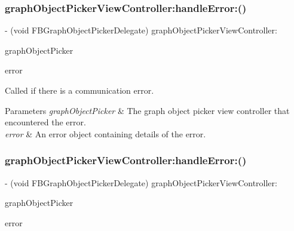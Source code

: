 \subsubsection{\texorpdfstring{graph\+Object\+Picker\+View\+Controller\+:handle\+Error\+:()}{graphObjectPickerViewController:handleError:()}\hspace{0.1cm}{\footnotesize\ttfamily [1/5]}}
{\footnotesize\ttfamily -\/ (void F\+B\+Graph\+Object\+Picker\+Delegate) graph\+Object\+Picker\+View\+Controller\+: \begin{DoxyParamCaption}\item[{(\hyperlink{interfaceFBGraphObjectPickerViewController}{F\+B\+Graph\+Object\+Picker\+View\+Controller} $\ast$)}]{graph\+Object\+Picker }\item[{handleError:(N\+S\+Error $\ast$)}]{error }\end{DoxyParamCaption}\hspace{0.3cm}{\ttfamily [optional]}}

Called if there is a communication error.


\begin{DoxyParams}{Parameters}
{\em graph\+Object\+Picker} & The graph object picker view controller that encountered the error. \\
\hline
{\em error} & An error object containing details of the error. \\
\hline
\end{DoxyParams}
\mbox{\label{protocolFBGraphObjectPickerDelegate_01-p_a99107978ecbc60a1a7daeeb2367d5cbf}} 
\subsubsection{\texorpdfstring{graph\+Object\+Picker\+View\+Controller\+:handle\+Error\+:()}{graphObjectPickerViewController:handleError:()}\hspace{0.1cm}{\footnotesize\ttfamily [2/5]}}
{\footnotesize\ttfamily -\/ (void F\+B\+Graph\+Object\+Picker\+Delegate) graph\+Object\+Picker\+View\+Controller\+: \begin{DoxyParamCaption}\item[{(\hyperlink{interfaceFBGraphObjectPickerViewController}{F\+B\+Graph\+Object\+Picker\+View\+Controller} $\ast$)}]{graph\+Object\+Picker }\item[{handleError:(N\+S\+Error $\ast$)}]{error }\end{DoxyParamCaption}\hspace{0.3cm}{\ttfamily [optional]}}


